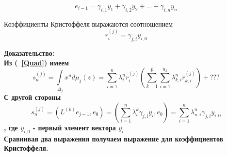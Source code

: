 \begin{equation}
e_{i-1}=\gamma_{i,1}y_1+ \gamma_{i,2}y_2 + \ldots +
\gamma_{i,n}y_n
\end{equation}
\begin{lema} Коэффициенты Кристоффеля выражаются соотношением
$$r_{i}^{(j)}=\gamma_{j,i}y_{i,0}$$
\end{lema}
\bf Доказательство: \rm \\
Из (~\ref{Quad}) имеем
\begin{equation}
s_n^{(j)} = \int \limits_{\Delta_j} x^n d\mu_j(z) =
\sum\limits_{i=1}^{n} {\lambda_{i}^n r_{i}^{(j)}}
\left(\sum\limits_{k=1}^{p} \sum\limits_{i=1}^{n_k}
{\lambda_{k,i}^n r_{k,i}^{(j)}}\right)+ ???
\end{equation}
С другой стороны
\begin{equation}
s_n^{(j)} = (L^{(k)}e_{j-1},e_0) =\left( \sum\limits_{i=1}^{n}
{\lambda_{i}^{k}\gamma_{j,i}y_{i}},e_0\right)= \sum_{i=1}^{n}
{\lambda_{n,i}^{n}\gamma_{j,i}y_{i,0}}
\end{equation}
, где $y_{i,0}$ - первый элемент вектора $y_i$ \\
Сравнивая два выражения получаем выражение для коэффициентов
Кристоффеля.

